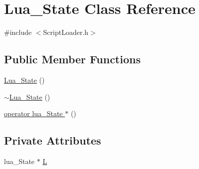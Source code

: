 \hypertarget{classLua__State}{\section{\-Lua\-\_\-\-State \-Class \-Reference}
\label{classLua__State}
}


{\ttfamily \#include $<$\-Script\-Loader.\-h$>$}

\subsection*{\-Public \-Member \-Functions}
\begin{DoxyCompactItemize}
\item 
\hyperlink{classLua__State_aa0b203e648c90666e79a5a417736932d}{\-Lua\-\_\-\-State} ()
\item 
\hyperlink{classLua__State_a33c6e11ea283e46205fbe8d0f3f8172b}{$\sim$\-Lua\-\_\-\-State} ()
\item 
\hyperlink{classLua__State_aca3de033478261d6b9850b7f09e76d2b}{operator lua\-\_\-\-State $\ast$} ()
\end{DoxyCompactItemize}
\subsection*{\-Private \-Attributes}
\begin{DoxyCompactItemize}
\item 
lua\-\_\-\-State $\ast$ \hyperlink{classLua__State_adf1bf0d484862b5cbe63ba5215fdc498}{\-L}
\end{DoxyCompactItemize}


